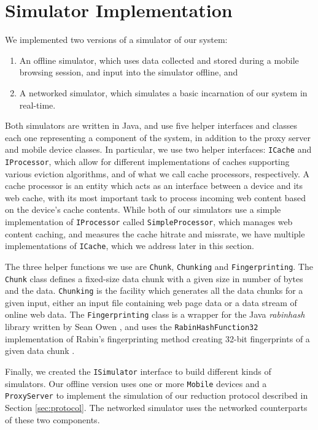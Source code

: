 \section{Simulator Implementation}
\label{sec:implementation}
We implemented two versions of a simulator of our system: 
\begin{enumerate}
\item An offline simulator, which uses data collected and stored during a mobile browsing session, and input into the simulator offline, and
\item A networked simulator, which simulates a basic incarnation of our system in real-time.
\end{enumerate}
Both simulators are written in Java, and use five helper interfaces and classes each one representing a component of the system, in addition to the proxy server and mobile device classes. In particular, we use two helper interfaces: \texttt{ICache} and \texttt{IProcessor}, which allow for different implementations of caches supporting various eviction algorithms, and of what we call cache processors, respectively. A cache processor is an entity which acts as an interface between a device and its web cache, with its most important task to process incoming web content based on the device's cache contents. While both of our simulators use a simple implementation of \texttt{IProcessor} called \texttt{SimpleProcessor}, which manages web content caching, and measures the cache hitrate and missrate, we have multiple implementations of \texttt{ICache}, which we address later in this section. 

The three helper functions we use are \texttt{Chunk}, \texttt{Chunking} and \texttt{Fingerprinting}. The \texttt{Chunk} class defines a fixed-size data chunk with a given size in number of bytes and the data. \texttt{Chunking} is the facility which generates all the data chunks for a given input, either an input file containing web page data or a data stream of online web data. The \texttt{Fingerprinting} class is a wrapper for the Java \emph{rabinhash} library written by Sean Owen \cite{rabinhash}, and uses the \texttt{RabinHashFunction32} implementation of Rabin's fingerprinting method creating 32-bit fingerprints of a given data chunk \cite{rabin_api}.

Finally, we created the \texttt{ISimulator} interface to build different kinds of simulators. Our offline version uses one or more \texttt{Mobile} devices and a \texttt{ProxyServer} to implement the simulation of our reduction protocol described in Section \ref{sec:protocol}. The networked simulator uses the networked counterparts of these two components.



